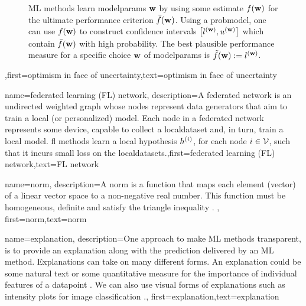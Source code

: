 {{\begin{figure}[htbp]
\begin{center}
\caption{ML methods learn \gls{modelparams} ${\bf w}$ by using some estimate $f({\bf w})$ for 
	the ultimate performance criterion $\bar{f}({\bf w})$. Using a \gls{probmodel}, one can use $f({\bf w})$ to 
	construct confidence intervals $\big[ l^{({\bf w})},  u^{({\bf w})} \big]$ which contain $\bar{f}({\bf w})$  
	with high probability. The best plausible performance measure for a specific choice ${\bf w}$ of \gls{modelparams} 
	is $\tilde{f}({\bf w}) := l^{({\bf w})}$.} 
	\end{center}
		\end{figure}},first={optimism in face of uncertainty},text={optimism in face of uncertainty} 
}

{name={federated learning (FL) network},
	description={A federated network is an undirected weighted \gls{graph} whose 
		nodes represent data generators that aim to train a local (or personalized) \gls{model}. 
		Each node in a federated network represents some device, capable to collect a \gls{localdataset} 
		and, in turn, train a local \gls{model}. 
	    \Gls{fl} methods learn a local \gls{hypothesis} $h^{(i)}$, for 
	    each node $i \in \mathcal{V}$, such that it incurs small \gls{loss} on the \gls{localdataset}s.},first={federated learning (FL) network},text={FL network} 
}

{name={norm},
	description={A norm is a function that maps each element (vector) 
		of a linear vector space to a non-negative real number. This function must be 
		homogeneous, definite and satisfy the triangle inequality \cite{HornMatAnalysis}. },
	first={norm},text={norm} 
}

{name={explanation},
	description={One approach to make ML methods transparent, is to provide an 
		explanation along with the \gls{prediction} delivered by an 
		ML method. Explanations can take on many different forms. An explanation 
		could be some natural text or some quantitative measure for the importance 
		of individual \gls{feature}s of a \gls{datapoint} \cite{Molnar2019}. We can also 
		use visual forms of explanations such as intensity plots for image classification \cite{GradCamPaper}.},
	first={explanation},text={explanation} 
}

